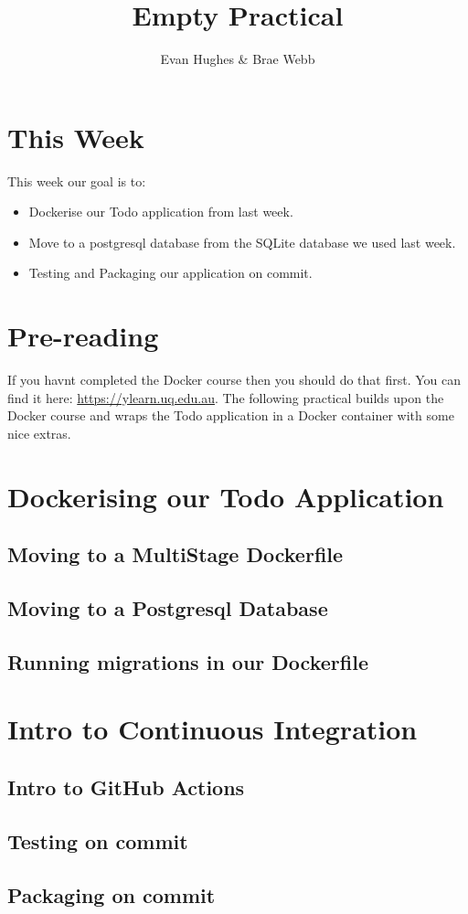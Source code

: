\documentclass{csse4400}
\title{Empty Practical}
\author{Evan Hughes \& Brae Webb}
\date{\week{0}}
\begin{document}
\maketitle

\section{This Week}
This week our goal is to:
\begin{itemize}
  \item Dockerise our Todo application from last week.
  \item Move to a postgresql database from the SQLite database we used last week.
  \item Testing and Packaging our application on commit.
\end{itemize}

\section{Pre-reading}
If you havnt completed the Docker course then you should do that first. You can find it here: \url{https://ylearn.uq.edu.au}. The following practical builds upon the Docker course and wraps the Todo application in a Docker container with some nice extras.

\section{Dockerising our Todo Application}

\subsection{Moving to a MultiStage Dockerfile}

\subsection{Moving to a Postgresql Database}

\subsection{Running migrations in our Dockerfile}

\section{Intro to Continuous Integration}

\subsection{Intro to GitHub Actions}

\subsection{Testing on commit}

\subsection{Packaging on commit}



\end{document}
